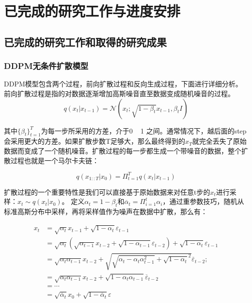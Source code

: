 \section{已完成的研究工作与进度安排}
\subsection{已完成的研究工作和取得的研究成果}\label{sec:finishwork}
\subsubsection{DDPM无条件扩散模型}\label{sec:DDPM}
DDPM模型包含两个过程，前向扩散过程和反向生成过程，下面进行详细分析。
前向扩散过程是指的对数据逐渐增加高斯噪音直至数据变成随机噪音的过程。
\begin{equation}\label{eqn-11}
      q(x_t|x_{t-1})=\mathcal{N}(x_t;\sqrt{1-\beta_t}x_{t-1},\beta_tI)
\end{equation}

其中$\{\beta_t\}^{T}_{t=1}$为每一步所采用的方差，介于0 ~ 1 之间。通常情况下，越后面的step会采用更大的方差。如果扩散步数T足够大，那么最终得到的$x_T$就完全丢失了原始数据而变成了一个随机噪音。扩散过程的每一步都生成一个带噪音的数据，整个扩散过程也就是一个马尔卡夫链：

\begin{equation}\label{eqn-12}
      q(x_{1::T}|x_0) = \Pi^T_{t=1}{q(x_t|x_{t-1})}
\end{equation}

扩散过程的一个重要特性是我们可以直接基于原始数据来对任意t步的$x_t$进行采样：$x_t \sim q(x_t|x_0)$。
定义$\alpha_t = 1 - \beta_t$和$\overline{\alpha}_t=\Pi^t_{i=1}{\alpha_i}$，通过重参数技巧，随机从标准高斯分布中采样，再将采样值作为噪声在数据中扩散，那么有：

$$\begin{aligned}
x_t &= \sqrt{\alpha_t}x_{t-1} + \sqrt{1-\alpha_t}\varepsilon_{t-1} \\
    &= \sqrt{\alpha_t}(\sqrt{\alpha_{t-1}}x_{t-2} + \sqrt{1-\alpha_{t-1}}\varepsilon_{t-2}) + \sqrt{1-\alpha_t}\varepsilon_{t-1} \\
    &= \sqrt{\alpha_t\alpha_{t-1}}x_{t-2} + \sqrt{\sqrt{\alpha_t-\alpha_t\alpha_{t-1}^2}+ \sqrt{1-\alpha_t}^2}\overline{\varepsilon}_{t-2}; \\
    &= \sqrt{\alpha_t\alpha_{t-1}}x_{t-2} + \sqrt{1-\alpha_t\alpha_{t-1}}\overline{\varepsilon}_{t-2} \\
    &= \cdots \\
    &= \sqrt{\overline{\alpha}_t}x_{0} + \sqrt{1-\overline{\alpha}_t}\varepsilon \label{eqn-13}
\end{aligned}$$


